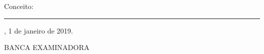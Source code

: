 \documentclass{article}
\begin{document}



%
% 
%
\begin{folhadeaprovacao}

  \begin{center}
    {\ABNTEXchapterfont\large\imprimirautor}

    \vspace*{\fill}\vspace*{\fill}
    \begin{center}
      \ABNTEXchapterfont\bfseries\Large\imprimirtitulo
    \end{center}
    \vspace*{\fill}
    
    \hspace{.45\textwidth}
    \begin{minipage}{.5\textwidth}
        \imprimirpreambulo
    \end{minipage}%
    \vspace*{\fill}
   \end{center}
        
   Conceito: \rule{3cm}{.1pt}
   
   \imprimirlocal, 1 de janeiro de 2019.
   
   \vspace{1cm}
   \begin{center}
   BANCA EXAMINADORA
   \end{center}
    

      

  
\end{folhadeaprovacao}
\end{document}
